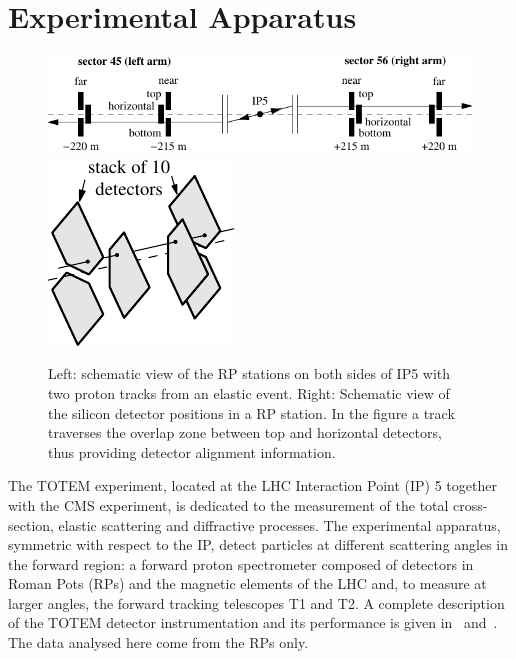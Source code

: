 \section{Experimental Apparatus}
\label{sec:exp apparatus}

\begin{figure}
\begin{center}
\includegraphics{fig/elastic_principle.pdf}
\hfil
\includegraphics{fig/stationScheme.pdf}
\caption{%
Left: schematic view of the RP stations on both sides of IP5 with two proton tracks from an elastic event. Right: Schematic view of the silicon detector positions in a RP station. In the figure a track traverses the overlap zone between top and horizontal detectors, thus providing detector alignment information. 
}
\label{fig:rpsketch}
\end{center}
\end{figure}

The TOTEM experiment, located at the LHC Interaction Point (IP) 5 together with the CMS experiment, is dedicated to the measurement of the total cross-section, elastic scattering and diffractive processes. The experimental apparatus, symmetric with respect to the IP, detect particles at different scattering angles in the forward region: a forward proton spectrometer composed of detectors in Roman Pots (RPs) and the magnetic elements of the LHC and, to measure at larger angles, the forward tracking telescopes T1 and T2. A complete description of the TOTEM detector instrumentation and its performance is given in~\cite{totem-jinst} and~\cite{totem-ijmp}. The data analysed here come from the RPs only. 

